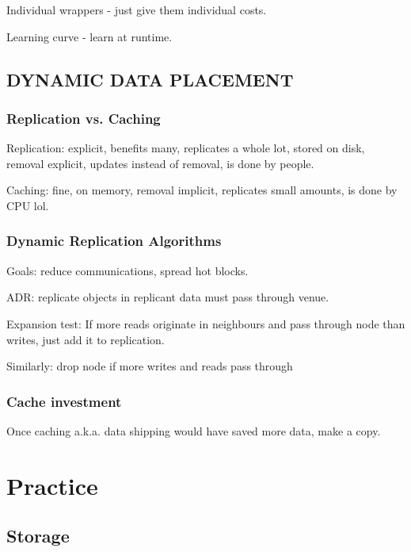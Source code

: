 \documentclass{article}
\begin{document}
		Individual wrappers - just give them individual costs.
		
		Learning curve - learn at runtime.
		
		\subsection{DYNAMIC DATA PLACEMENT}
		
			\subsubsection{ Replication vs. Caching}
			
				Replication: explicit, benefits many, replicates a whole lot, stored on disk, removal explicit, updates instead of removal, is done by people.
				
				Caching: fine, on memory, removal implicit, replicates small amounts, is done by CPU lol.
				
			\subsubsection{Dynamic Replication Algorithms}
			
				Goals: reduce communications, spread hot blocks.
				
				ADR: replicate objects in replicant data must pass through venue.
				
				Expansion test: If more reads originate in neighbours and pass through node than writes, just add it to replication.
				
				Similarly: drop node if more writes and reads pass through
				
			\subsubsection{Cache investment}
			
				Once caching a.k.a. data shipping would have saved more data, make a copy.
				
				
\newpage\phantom{asd}
\newpage

\section{Practice}

	\subsection{Storage}
\end{document}
